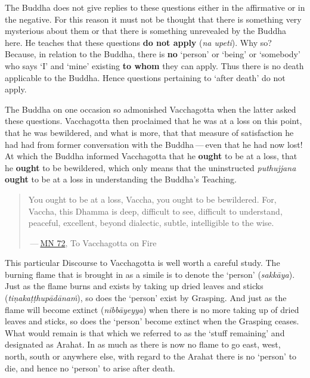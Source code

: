 The Buddha does not give replies to these questions either in the affirmative or in the negative. For this reason it must not be thought that there is something very mysterious about them or that there is something unrevealed by the Buddha here. He teaches that these questions \textbf{do not apply} (\emph{na upeti}). Why so? Because, in relation to the Buddha, there is \textbf{no} `person' or `being' or `somebody' who says `I' and `mine' existing \textbf{to whom} they can apply. Thus there is no death applicable to the Buddha. Hence questions pertaining to `after death' do not apply.

The Buddha on one occasion so admonished Vacchagotta when the latter asked these questions. Vacchagotta then proclaimed that he was at a loss on this point, that he was bewildered, and what is more, that that measure of satisfaction he had had from former conversation with the Buddha --- even that he had now lost! At which the Buddha informed Vacchagotta that he \textbf{ought} to be at a loss, that he \textbf{ought} to be bewildered, which only means that the uninstructed \emph{puthujjana} \textbf{ought} to be at a loss in understanding the Buddha's Teaching.

\begin{quote}
You ought to be at a loss, Vaccha, you ought to be bewildered. For, Vaccha, this Dhamma is deep, difficult to see, difficult to understand, peaceful, excellent, beyond dialectic, subtle, intelligible to the wise.

 --- \href{https://suttacentral.net/mn72/en/thanissaro}{MN 72}, To Vacchagotta on Fire
\end{quote}

This particular Discourse to Vacchagotta is well worth a careful study. The burning flame that is brought in as a simile is to denote the `person' (\emph{sakkāya}). Just as the flame burns and exists by taking up dried leaves and sticks (\emph{tiṇakaṭṭhupādānaṁ}), so does the `person' exist by Grasping. And just as the flame will become extinct (\emph{nibbāyeyya}) when there is no more taking up of dried leaves and sticks, so does the `person' become extinct when the Grasping ceases. What would remain is that which we referred to as the `stuff remaining' and designated as Arahat. In as much as there is now no flame to go east, west, north, south or anywhere else, with regard to the Arahat there is no `person' to die, and hence no `person' to arise after death.

